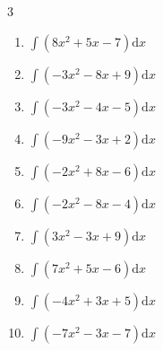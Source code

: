 \begin{multicols}{3}
\begin{enumerate}
  \item $\displaystyle \int \left( 8x^{2}+5x-7 \right) \mathrm{d}x$


  \item $\displaystyle \int \left( -3x^{2}-8x+9 \right) \mathrm{d}x$


  \item $\displaystyle \int \left( -3x^{2}-4x-5 \right) \mathrm{d}x$


  \item $\displaystyle \int \left( -9x^{2}-3x+2 \right) \mathrm{d}x$


  \item $\displaystyle \int \left( -2x^{2}+8x-6 \right) \mathrm{d}x$


  \item $\displaystyle \int \left( -2x^{2}-8x-4 \right) \mathrm{d}x$


  \item $\displaystyle \int \left( 3x^{2}-3x+9 \right) \mathrm{d}x$


  \item $\displaystyle \int \left( 7x^{2}+5x-6 \right) \mathrm{d}x$


  \item $\displaystyle \int \left( -4x^{2}+3x+5 \right) \mathrm{d}x$


  \item $\displaystyle \int \left( -7x^{2}-3x-7 \right) \mathrm{d}x$


\columnbreak %


\end{enumerate}
\end{multicols}
